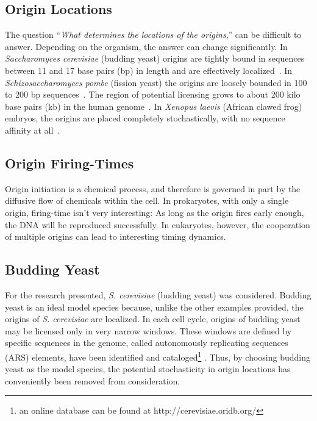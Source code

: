 	
		\subsection{Origin Locations}
		\label{subsec:OriginLocations}
		
		The question ``\emph{What determines the locations of the origins},'' can be difficult to answer.
		Depending on the organism, the answer can change significantly.
		In \emph{Saccharomyces cerevisiae} (budding yeast) origins are tightly bound in sequences between 11 and 17 base pairs (bp) in length and are effectively localized~\cite{ScottsPaper}.
		In \emph{Schizosaccharomyces pombe} (fission yeast) the origins are loosely bounded in 100 to 200 bp sequences~\cite{OriginsReview}.
		The region of potential licensing grows to about 200 kilo base pairs (kb) in the human genome~\cite{HumanGenome}.
		In \emph{Xenopus laevis} (African clawed frog) embryos, the origins are placed completely stochastically, with no sequence affinity at all~\cite{FrogEmbryo}.
		
		
		\subsection{Origin Firing-Times}
		\label{subsec:OriginTimes}
		
		Origin initiation is a chemical process, and therefore is governed in part by the diffusive flow of chemicals within the cell.
		In prokaryotes, with only a single origin, firing-time isn't very interesting:
		As long as the origin fires early enough, the DNA will be reproduced successfully.
		In eukaryotes, however, the cooperation of multiple origins can lead to interesting timing dynamics.
		
		
		
		
		\subsection{Budding Yeast}
		\label{subsec:BuddingYeast}
		
		For the research presented, \emph{S. cerevisiae} (budding yeast) was considered.
		Budding yeast is an ideal model species because, unlike the other examples provided, the origins of \emph{S. cerevisiae} are localized.
		In each cell cycle, origins of budding yeast may be licensed only in very narrow windows.
		These windows are defined by specific sequences in the genome, called autonomously replicating sequences (ARS) elements, have been identified and cataloged\footnote{an online database can be found at http://cerevisiae.oridb.org/} \cite{OriDB}.
		Thus, by choosing budding yeast as the model species, the potential stochasticity in origin locations has conveniently been removed from consideration.
		
